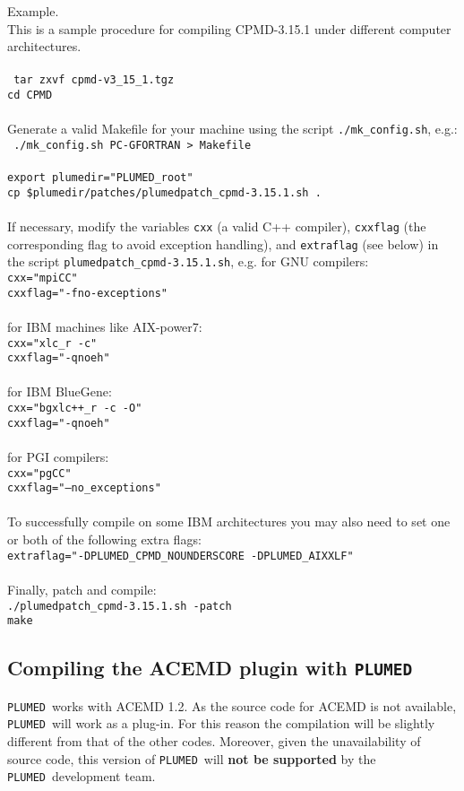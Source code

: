 \documentclass[12pt,fleqn]{report}
\newcommand{\plumed}{{\tt PLUMED}}
\newcommand{\esempio}[1]{
\vspace{10pt}
\begin{flushright}
\colorbox{light-gray}{
   \begin{minipage}{13cm}
       \scriptsize{
{\fontfamily{phv} \fontseries{b}
 \selectfont Example. \\
 \fontseries{m} \selectfont #1 } }
\end{minipage}}
\end{flushright}
\vspace{20pt}
}
\begin{document}
\esempio{
This is a sample procedure for compiling CPMD-3.15.1 under different computer architectures.\\ \\
{\tt
tar zxvf cpmd-v3\_15\_1.tgz \\
cd CPMD
} \\ \\ 
Generate a valid Makefile for your machine using the script {\tt ./mk\_config.sh}, e.g.: \\ 
{\tt 
./mk\_config.sh PC-GFORTRAN > Makefile \\ \\
export plumedir="PLUMED\_root" \\
cp \${plumedir}/patches/plumedpatch\_cpmd-3.15.1.sh .
} \\ \\
If necessary, modify the variables {\tt cxx} (a valid C++ compiler), {\tt cxxflag} (the corresponding flag to avoid exception handling), 
and {\tt extraflag} (see below) in the script {\tt plumedpatch\_cpmd-3.15.1.sh}, e.g.
for GNU compilers: \\
{\tt cxx="mpiCC" \\ cxxflag="-fno-exceptions" } \\ \\
for IBM machines like AIX-power7: \\
{\tt cxx="xlc\_r -c" \\ cxxflag="-qnoeh" } \\ \\
for IBM BlueGene: \\
{\tt cxx="bgxlc++\_r -c -O" \\ cxxflag="-qnoeh" } \\ \\
for PGI compilers: \\
{\tt cxx="pgCC" \\ cxxflag="--no\_exceptions" } \\ \\
To successfully compile on some IBM architectures you may also need to set one or both of the following extra flags: \\
{\tt extraflag="-DPLUMED\_CPMD\_NOUNDERSCORE -DPLUMED\_AIXXLF"} \\ \\
Finally, patch and compile:\\ 
{\tt ./plumedpatch\_cpmd-3.15.1.sh -patch \\
make }
}

\subsection{Compiling the ACEMD plugin with \plumed}
\plumed \ works with ACEMD 1.2.
As the source code for ACEMD is not available, \plumed \ 
will work as a plug-in. For this reason the compilation
will be slightly different from that of the other codes.
Moreover, given the unavailability of source code,
this version of \plumed \ will {\bf not be supported} by the \plumed \ 
development team. 
\end{document}
